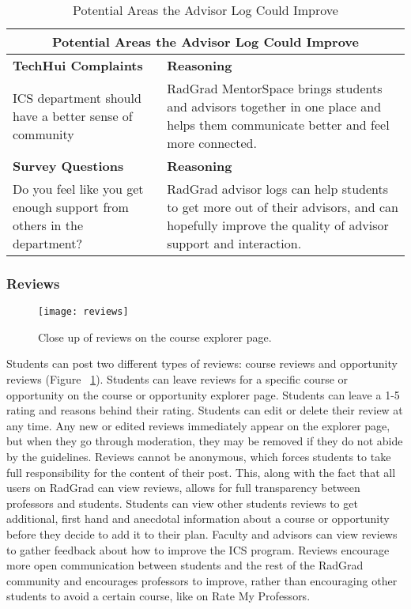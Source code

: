 \begin{table}[htbp!]
\centering
\begin{tabular}{  |p{4cm}|p{12cm}| } 
\hline
 \multicolumn{2}{|c|}{Potential Areas the Advisor Log Could Improve}\\
  \hline
 \textbf{TechHui Complaints} & \textbf{Reasoning} \\ 
  \hline
  ICS department should have a better sense of community & RadGrad MentorSpace brings students and advisors together in one place and helps them communicate better and feel more connected.\\
  \hline
 \textbf{Survey Questions} & \textbf{Reasoning} \\ 
  \hline
  Do you feel like you get enough support from others in the department? & RadGrad advisor logs can help students to get more out of their advisors, and can hopefully improve the quality of advisor support and interaction.\\
  \hline
\end{tabular}
 \caption{Potential Areas the Advisor Log Could Improve}
\end{table}

\subsubsection{Reviews}

\begin{figure}[htbp!]
\centering
\texttt{[image: reviews]}
\caption{Close up of reviews on the course explorer page.}
\label{reviews}
\end{figure}
Students can post two different types of reviews: course reviews and opportunity reviews (Figure ~\ref{reviews}). Students can leave reviews for a specific course or opportunity on the course or opportunity explorer page. Students can leave a 1-5 rating and reasons behind their rating. Students can edit or delete their review at any time. Any new or edited reviews immediately appear on the explorer page, but when they go through moderation, they may be removed if they do not abide by the guidelines. Reviews cannot be anonymous, which forces students to take full responsibility for the content of their post. This, along with the fact that all users on RadGrad can view reviews, allows for full transparency between professors and students. Students can view other students reviews to get additional, first hand and anecdotal information about a course or opportunity before they decide to add it to their plan. Faculty and advisors can view reviews to gather feedback about how to improve the ICS program. Reviews encourage more open communication between students and the rest of the RadGrad community and encourages professors to improve, rather than encouraging other students to avoid a certain course, like on Rate My Professors. 

